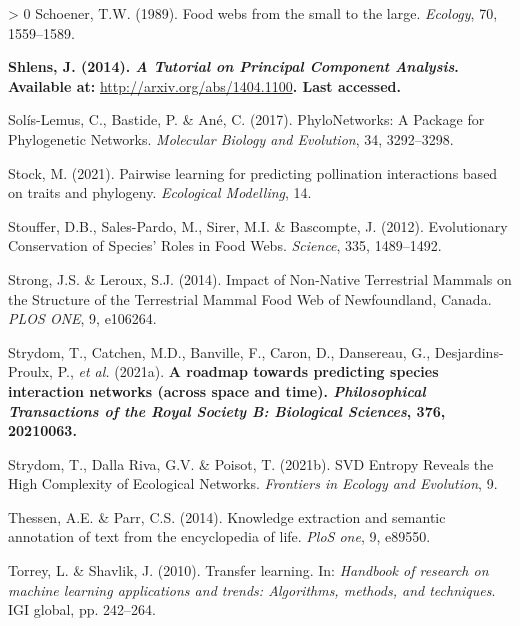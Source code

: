 \documentclass[11pt]{article}
\makeatletter
\def\maxwidth{\ifdim\Gin@nat@width>\linewidth\linewidth
\else\Gin@nat@width\fi}
\let\Oldincludegraphics\includegraphics
\renewcommand{\includegraphics}[1]{\Oldincludegraphics[width=\maxwidth]{#1}}
\newlength{\cslhangindent}
\newenvironment{CSLReferences}[3] %
 {%
  \setlength{\parindent}{0pt}
  \ifodd #1 \everypar{\setlength{\hangindent}{\cslhangindent}}\ignorespaces\fi
  \ifnum #2 > 0
  \setlength{\parskip}{#2\baselineskip}
  \fi
 }%
 {}
\providecommand{\DIFaddtex}[1]{{\bf #1}} %
\providecommand{\DIFdeltex}[1]{} %
\providecommand{\DIFaddbegin}{\protect\color{blue}} %
\providecommand{\DIFaddend}{\protect\color{black}} %
\providecommand{\DIFdelbegin}{\protect\color{red}} %
\providecommand{\DIFdelend}{\protect\color{black}} %
\providecommand{\DIFadd}[1]{\texorpdfstring{\DIFaddtex{#1}}{#1}} %
\providecommand{\DIFdel}[1]{\texorpdfstring{\DIFdeltex{#1}}{}} %
\newcommand{\DIFscaledelfig}{0.5}
\newlength{\DIFdelgraphicswidth} %
\newlength{\DIFdelgraphicsheight} %
\newcommand{\DIFaddincludegraphics}[2][]{{\color{blue}\fbox{\DIFOincludegraphics[#1]{#2}}}} %
\newcommand{\DIFdelincludegraphics}[2][]{%
\sbox{\DIFdelgraphicsbox}{\DIFOincludegraphics[#1]{#2}}%
\settoboxwidth{\DIFdelgraphicswidth}{\DIFdelgraphicsbox} %
\settoboxtotalheight{\DIFdelgraphicsheight}{\DIFdelgraphicsbox} %
\scalebox{\DIFscaledelfig}{%
\parbox[b]{\DIFdelgraphicswidth}{\usebox{\DIFdelgraphicsbox}\\[-\baselineskip] \rule{\DIFdelgraphicswidth}{0em}}\llap{\resizebox{\DIFdelgraphicswidth}{\DIFdelgraphicsheight}{%
\setlength{\unitlength}{\DIFdelgraphicswidth}%
\begin{picture}(1,1)%
\thicklines\linethickness{2pt} %
{\color[rgb]{1,0,0}\put(0,0){\framebox(1,1){}}}%
{\color[rgb]{1,0,0}\put(0,0){\line( 1,1){1}}}%
{\color[rgb]{1,0,0}\put(0,1){\line(1,-1){1}}}%
\end{picture}%
}\hspace*{3pt}}} %
} %
\DeclareRobustCommand{\DIFaddbegin}{\DIFOaddbegin \let\includegraphics\DIFaddincludegraphics} %
\DeclareRobustCommand{\DIFaddend}{\DIFOaddend \let\includegraphics\DIFOincludegraphics} %
\DeclareRobustCommand{\DIFdelbegin}{\DIFOdelbegin \let\includegraphics\DIFdelincludegraphics} %
\DeclareRobustCommand{\DIFdelend}{\DIFOaddend \let\includegraphics\DIFOincludegraphics} %
\makeatother
\begin{document}
\begin{CSLReferences}{1}{0}
\leavevmode\hypertarget{ref-Schoener1989FooWeb}{}%
Schoener, T.W. (1989). Food webs from the small to the large.
\emph{Ecology}, 70, 1559--1589.

\leavevmode\DIFaddbegin \hypertarget{ref-Shlens2014TutPri}{}%
\DIFadd{Shlens, J. (2014). \emph{A Tutorial on Principal Component Analysis}.
Available at: }\url{http://arxiv.org/abs/1404.1100}\DIFadd{. Last accessed.
}

\leavevmode\DIFaddend \hypertarget{ref-Solis-Lemus2017PhyPac}{}%
Solís-Lemus, C., Bastide, P. \& Ané, C. (2017). PhyloNetworks: A Package
for Phylogenetic Networks. \emph{Molecular Biology and Evolution}, 34,
3292--3298.

\leavevmode\hypertarget{ref-Stock2021PaiLea}{}%
Stock, M. (2021). Pairwise learning for predicting pollination
interactions based on traits and phylogeny. \emph{Ecological Modelling},
14.

\leavevmode\hypertarget{ref-Stouffer2012EvoCon}{}%
Stouffer, D.B., Sales-Pardo, M., Sirer, M.I. \& Bascompte, J. (2012).
Evolutionary Conservation of Species' Roles in Food Webs.
\emph{Science}, 335, 1489--1492.

\leavevmode\hypertarget{ref-Strong2014ImpNon}{}%
Strong, J.S. \& Leroux, S.J. (2014). Impact of Non-Native Terrestrial
Mammals on the Structure of the Terrestrial Mammal Food Web of
Newfoundland, Canada. \emph{PLOS ONE}, 9, e106264.

\leavevmode\hypertarget{ref-Strydom2021RoaPre}{}%
Strydom, T., Catchen, M.D., Banville, F., Caron, D., Dansereau, G.,
Desjardins-Proulx, P., \emph{et al.} (2021a). \DIFdelbegin \DIFdel{\emph{A Roadmap Toward
Predicting Species Interaction Networks (Across Space and Time)}
(Preprint).
EcoEvoRxiv.
}\DIFdelend \DIFaddbegin \DIFadd{A roadmap towards
predicting species interaction networks (across space and time).
\emph{Philosophical Transactions of the Royal Society B: Biological
Sciences}, 376, 20210063.
}\DIFaddend 

\leavevmode\hypertarget{ref-Strydom2021SvdEnt}{}%
Strydom, T., Dalla Riva, G.V. \& Poisot, T. (2021b). SVD Entropy Reveals
the High Complexity of Ecological Networks. \emph{Frontiers in Ecology
and Evolution}, 9.

\leavevmode\hypertarget{ref-Thessen2014KnoExt}{}%
Thessen, A.E. \& Parr, C.S. (2014). Knowledge extraction and semantic
annotation of text from the encyclopedia of life. \emph{PloS one}, 9,
e89550.

\leavevmode\hypertarget{ref-Torrey2010TraLea}{}%
Torrey, L. \& Shavlik, J. (2010). Transfer learning. In: \emph{Handbook
of research on machine learning applications and trends: Algorithms,
methods, and techniques}. IGI global, pp. 242--264.


\end{CSLReferences}
\end{document}

